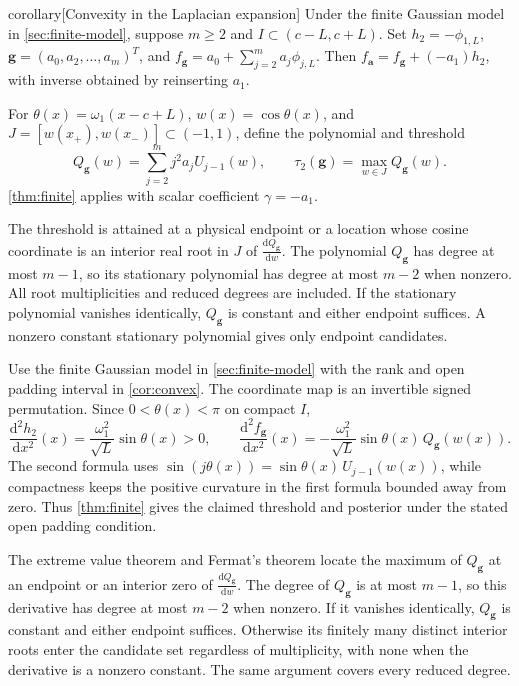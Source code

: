 \begin{theoremEnd}[combined main,category=convex]{corollary}[Convexity in the Laplacian expansion]
\label{cor:convex}
Under the finite Gaussian model in \cref{sec:finite-model}, suppose
$m\geq2$ and $I\subset(c-L,c+L)$. Set $h_2=-\phi_{1,L}$,
$\boldsymbol g=(a_0,a_2,\ldots,a_m)^T$, and
$f_{\boldsymbol g}=a_0+\sum_{j=2}^ma_j\phi_{j,L}$.
Then $f_{\boldsymbol a}=f_{\boldsymbol g}+(-a_1)h_2$, with inverse
obtained by reinserting $a_1$.

For $\theta(x)=\omega_1(x-c+L)$, $w(x)=\cos\theta(x)$, and
$J=[w(x_+),w(x_-)]\subset(-1,1)$, define the polynomial and threshold
\begin{equation}\label{eq:convex-threshold}
 Q_{\boldsymbol g}(w)=\sum_{j=2}^mj^2a_jU_{j-1}(w),
 \qquad \tau_2(\boldsymbol g)=\max_{w\in J}Q_{\boldsymbol g}(w).
\end{equation}
\cref{thm:finite} applies with scalar coefficient $\gamma=-a_1$.

The threshold is attained at a physical endpoint or a location whose
cosine coordinate is an interior real root in $J$ of
$\frac{\mathrm{d}Q_{\boldsymbol g}}{\mathrm{d}w}$. The polynomial $Q_{\boldsymbol g}$
has degree at most $m-1$, so its stationary polynomial has degree at
most $m-2$ when nonzero. All root multiplicities and reduced degrees
are included. If the stationary polynomial vanishes identically,
$Q_{\boldsymbol g}$ is constant and either endpoint suffices.
A nonzero constant stationary polynomial gives only endpoint candidates.
\end{theoremEnd}

\begin{proofEnd}
Use the finite Gaussian model in \cref{sec:finite-model} with the rank and open padding interval in
\cref{cor:convex}. The coordinate map is an invertible signed
permutation. Since $0<\theta(x)<\pi$ on compact $I$,
\[
 \frac{\mathrm{d}^2h_2}{\mathrm{d}x^2}(x)=\frac{\omega_1^2}{\sqrt L}\sin\theta(x)>0,
 \qquad
 \frac{\mathrm{d}^2f_{\boldsymbol g}}{\mathrm{d}x^2}(x)=
 -\frac{\omega_1^2}{\sqrt L}\sin\theta(x)\,Q_{\boldsymbol g}(w(x)).
\]
The second formula uses
$\sin(j\theta(x))=\sin\theta(x)\,U_{j-1}(w(x))$, while compactness
keeps the positive curvature in the first formula bounded away from
zero. Thus \cref{thm:finite} gives the claimed threshold and posterior
under the stated open padding condition.

The extreme value theorem and Fermat's theorem locate the maximum
of $Q_{\boldsymbol g}$ at an endpoint or an interior zero of
$\frac{\mathrm{d}Q_{\boldsymbol g}}{\mathrm{d}w}$. The degree of $Q_{\boldsymbol g}$
is at most $m-1$, so this derivative has degree at most $m-2$ when
nonzero. If it vanishes identically, $Q_{\boldsymbol g}$ is constant
and either endpoint suffices. Otherwise its finitely many distinct
interior roots enter the candidate set regardless of multiplicity,
with none when the derivative is a nonzero constant. The same
argument covers every reduced degree.
\end{proofEnd}
